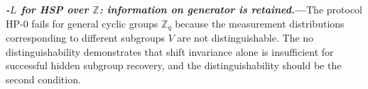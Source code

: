 \documentclass[reprint, aps, prl, superscriptaddress]{revtex4-2}
\renewcommand{\section}[1]{\par\medskip\noindent\textbf{{\textit{#1.}---}}}
\newcommand{\myqc}{\text{HP}}
\begin{document}







\section{\myqc-$L$ for HSP over $\mathbb{Z}$: information on generator is retained}The protocol $\myqc$-0 fails for general cyclic groups $\mathbb{Z}_q$ because the measurement distributions corresponding to different subgroups $V$ are not distinguishable. The no distinguishability demonstrates that shift invariance alone is insufficient for successful hidden subgroup recovery, and the distinguishability should be the second condition. 
\end{document}
